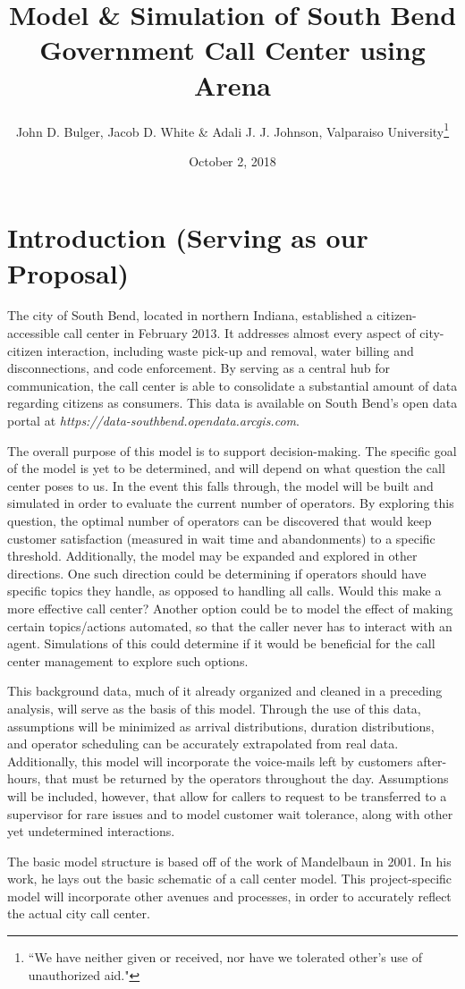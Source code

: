 \documentclass[11pt,twocolumn]{article}
\title{Model \& Simulation of South Bend Government Call Center using Arena}
\author{John D. Bulger, Jacob D. White \& Adali J. J. Johnson, Valparaiso University\thanks{``We have neither given or received, nor have we tolerated other’s use of unauthorized aid."}}
\date{October 2, 2018}
\begin{document}
\maketitle

\section{Introduction (Serving as our Proposal)}
The city of South Bend, located in northern Indiana, established a citizen-accessible call center in February 2013.  It addresses almost every aspect of city-citizen interaction, including waste pick-up and removal, water billing and disconnections, and code enforcement.  By serving as a central hub for communication, the call center is able to consolidate a substantial amount of data regarding citizens as consumers.  This data is available on South Bend's open data portal at \textit{https://data-southbend.opendata.arcgis.com}.
\par
The overall purpose of this model is to support decision-making.  The specific goal of the model is yet to be determined, and will depend on what question the call center poses to us.  In the event this falls through, the model will be built and simulated in order to evaluate the current number of operators.  By exploring this question, the optimal number of operators can be discovered that would keep customer satisfaction (measured in wait time and abandonments) to a specific threshold.  Additionally, the model may be expanded and explored in other directions. One such direction could be determining if operators should have specific topics they handle, as opposed to handling all calls.  Would this make a more effective call center?  Another option could be to model the effect of making certain topics/actions automated, so that the caller never has to interact with an agent.  Simulations of this could determine if it would be beneficial for the call center management to explore such options.
\par
This background data, much of it already organized and cleaned in a preceding analysis, will serve as the basis of this model.  Through the use of this data, assumptions will be minimized as arrival distributions, duration distributions, and operator scheduling can be accurately extrapolated from real data.  Additionally, this model will incorporate the voice-mails left by customers after-hours, that must be returned by the operators throughout the day.  Assumptions will be included, however, that allow for callers to request to be transferred to a supervisor for rare issues and to model customer wait tolerance, along with other yet undetermined interactions.
\par
The basic model structure is based off of the work of Mandelbaun in 2001.  In his work, he lays out the basic schematic of a call center model.\cite{mandelbaun}  This project-specific model will incorporate other avenues and processes, in order to accurately reflect the actual city call center.
\end{document}
